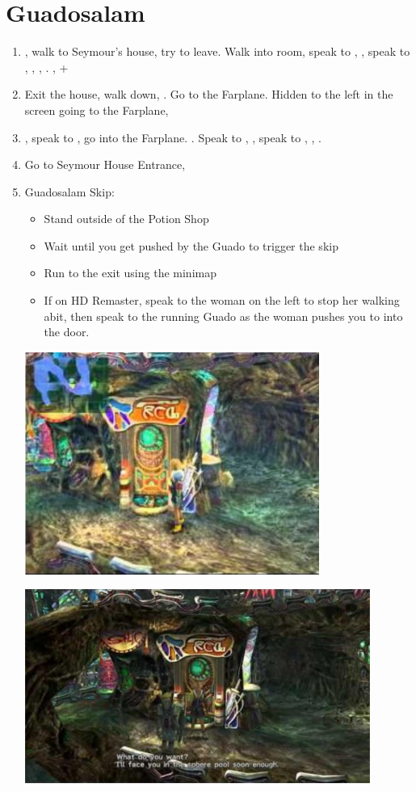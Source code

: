\chapter{Guadosalam}

\begin{enumerate}
  \item \sd, walk to Seymour's house, try to leave. Walk into room, speak to \auron, \sd, speak to \wakka, \lulu, \rikku, \yuna. \sd, \fmv+\cs[5:50]
  \item Exit the house, walk down, \sd. Go to the Farplane. Hidden to the left in the screen going to the Farplane, 
  \item \sd, speak to \auron, go into the Farplane. \cs[1:20]. Speak to \wakka, \sd, speak to \yuna, \cs[2:10], \sd.
  \item Go to Seymour House Entrance, \sd
  \item Guadosalam Skip:
        \begin{itemize}
          \item Stand outside of the Potion Shop
          \item Wait until you get pushed by the Guado to trigger the skip
          \item Run to the exit using the minimap
          \item If on HD Remaster, speak to the woman on the left to stop her walking abit, then speak to the running Guado as the woman pushes you to into the door.
        \end{itemize}
        \includegraphics{graphics/guadoskipstandard}

        \includegraphics{graphics/guadoskipremaster}
\end{enumerate}